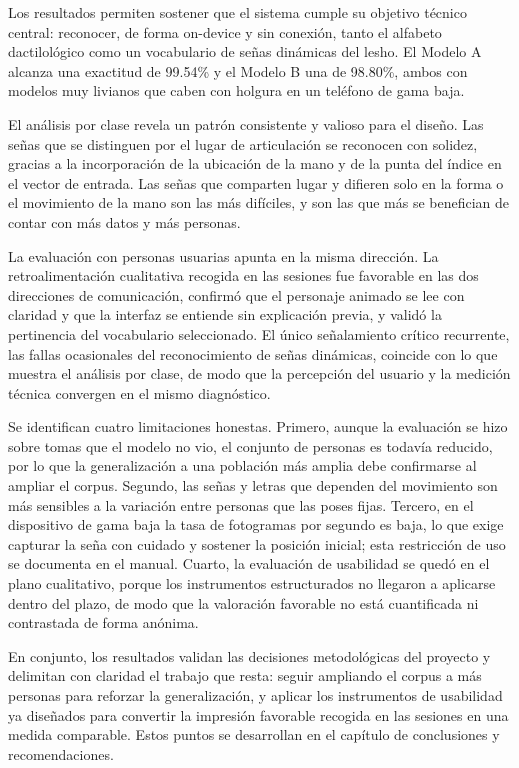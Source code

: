 Los resultados permiten sostener que el sistema cumple su objetivo técnico central: reconocer, de forma on-device y sin conexión, tanto el alfabeto dactilológico como un vocabulario de señas dinámicas del \Acrshort{lesho}. El Modelo A alcanza una exactitud de 99.54\% y el Modelo B una de 98.80\%, ambos con modelos muy livianos que caben con holgura en un teléfono de gama baja.

El análisis por clase revela un patrón consistente y valioso para el diseño. Las señas que se distinguen por el lugar de articulación se reconocen con solidez, gracias a la incorporación de la ubicación de la mano y de la punta del índice en el vector de entrada. Las señas que comparten lugar y difieren solo en la forma o el movimiento de la mano son las más difíciles, y son las que más se benefician de contar con más datos y más personas.

La evaluación con personas usuarias apunta en la misma dirección. La retroalimentación cualitativa recogida en las sesiones fue favorable en las dos direcciones de comunicación, confirmó que el personaje animado se lee con claridad y que la interfaz se entiende sin explicación previa, y validó la pertinencia del vocabulario seleccionado. El único señalamiento crítico recurrente, las fallas ocasionales del reconocimiento de señas dinámicas, coincide con lo que muestra el análisis por clase, de modo que la percepción del usuario y la medición técnica convergen en el mismo diagnóstico.

Se identifican cuatro limitaciones honestas. Primero, aunque la evaluación se hizo sobre tomas que el modelo no vio, el conjunto de personas es todavía reducido, por lo que la generalización a una población más amplia debe confirmarse al ampliar el corpus. Segundo, las señas y letras que dependen del movimiento son más sensibles a la variación entre personas que las poses fijas. Tercero, en el dispositivo de gama baja la tasa de fotogramas por segundo es baja, lo que exige capturar la seña con cuidado y sostener la posición inicial; esta restricción de uso se documenta en el manual. Cuarto, la evaluación de usabilidad se quedó en el plano cualitativo, porque los instrumentos estructurados no llegaron a aplicarse dentro del plazo, de modo que la valoración favorable no está cuantificada ni contrastada de forma anónima.

En conjunto, los resultados validan las decisiones metodológicas del proyecto y delimitan con claridad el trabajo que resta: seguir ampliando el corpus a más personas para reforzar la generalización, y aplicar los instrumentos de usabilidad ya diseñados para convertir la impresión favorable recogida en las sesiones en una medida comparable. Estos puntos se desarrollan en el capítulo de conclusiones y recomendaciones.
